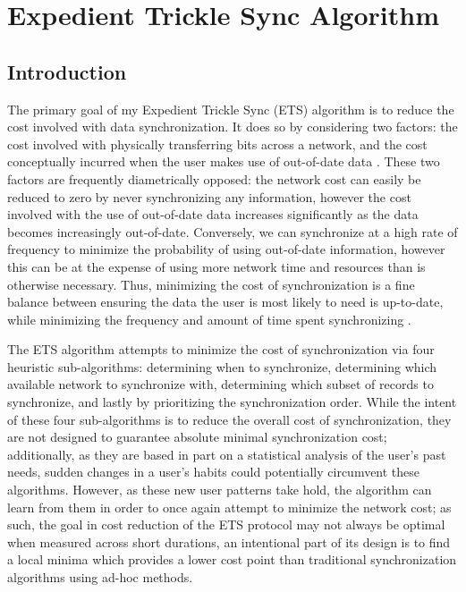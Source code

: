 \chapter{Expedient Trickle Sync Algorithm} 

\section{Introduction}  

The primary goal of my Expedient Trickle Sync (ETS) algorithm is to reduce the cost involved with data synchronization.  It does so by considering two factors:  the cost involved with physically transferring bits across a network, and the cost conceptually incurred when the user makes use of out-of-date data .  These two factors are frequently diametrically opposed:  the network cost can easily be reduced to zero by never synchronizing any information, however the cost involved with the use of out-of-date data increases significantly as the data becomes increasingly out-of-date.  Conversely, we can synchronize at a high rate of frequency to minimize the probability of using out-of-date information, however this can be at the expense of using more network time and resources than is otherwise necessary.  Thus, minimizing the cost of synchronization is a fine balance between ensuring the data the user is most likely to need is up-to-date, while minimizing the frequency and amount of time spent synchronizing \cite{1704823}.

The ETS algorithm attempts to minimize the cost of synchronization via four heuristic sub-algorithms:  determining when to synchronize, determining which available network to synchronize with, determining which subset of records to synchronize, and lastly by prioritizing the synchronization order.  While the intent of these four sub-algorithms is to reduce the overall cost of synchronization, they are not designed to guarantee absolute minimal synchronization cost; additionally, as they are based in part on a statistical analysis of the user's past needs, sudden changes in a user's habits could potentially circumvent these algorithms.  However, as these new user patterns take hold, the algorithm can learn from them in order to once again attempt to minimize the network cost; as such, the goal in cost reduction of the ETS protocol may not always be optimal when measured across short durations, an intentional part of its design is to find a local minima which provides a lower cost point than traditional synchronization algorithms using ad-hoc methods.


